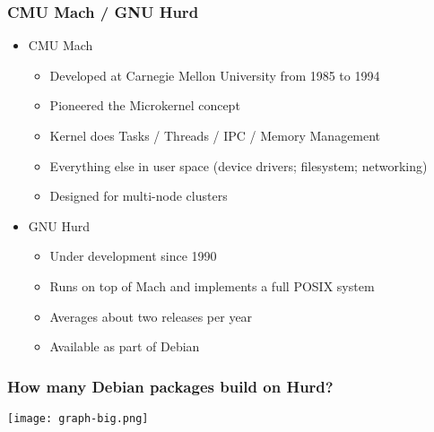 \documentclass{beamer}
\begin{document}
\begin{frame}
\frametitle{CMU Mach / GNU Hurd}
\begin{itemize}
\item{CMU Mach}
\begin{itemize}
\item Developed at Carnegie Mellon University from 1985 to 1994
\item Pioneered the Microkernel concept
\item Kernel does Tasks / Threads / IPC / Memory Management
\item Everything else in user space (device drivers; filesystem; networking)
\item Designed for multi-node clusters
\end{itemize}
\item{GNU Hurd}
\begin{itemize}
\item Under development since 1990
\item Runs on top of Mach and implements a full POSIX system
\item Averages about two releases per year
\item Available as part of Debian
\end{itemize}
\end{itemize}
\end{frame}

\begin{frame}
\frametitle{How many Debian packages build on Hurd?}
\texttt{[image: graph-big.png]}
\end{frame}
\end{document}
